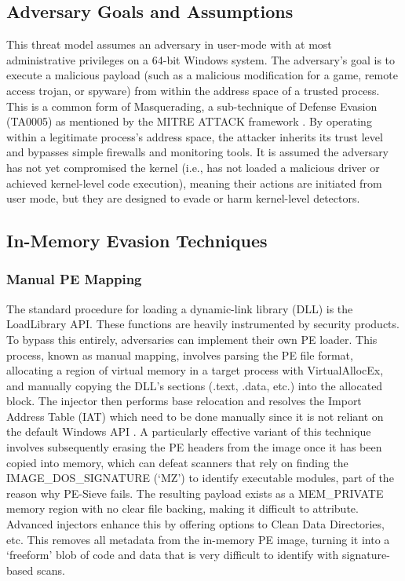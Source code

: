 \documentclass[journal]{IEEEtran}
\begin{document}
\subsection{Adversary Goals and Assumptions}
This threat model assumes an adversary in user-mode with at most administrative privileges on a 64-bit Windows system. The adversary's goal is to execute a malicious payload (such as a malicious modification for a game, remote access trojan, or spyware) from within the address space of a trusted process. This is a common form of Masquerading, a sub-technique of Defense Evasion (TA0005) as mentioned by the MITRE ATTACK framework \cite{MITRE_ATTACK_DEFENSE_EVASION}. By operating within a legitimate process's address space, the attacker inherits its trust level and bypasses simple firewalls and monitoring tools. It is assumed the adversary has not yet compromised the kernel (i.e., has not loaded a malicious driver or achieved kernel-level code execution), meaning their actions are initiated from user mode, but they are designed to evade or harm kernel-level detectors.
\subsection{In-Memory Evasion Techniques}
\subsubsection{Manual PE Mapping}
The standard procedure for loading a dynamic-link library (DLL) is the LoadLibrary API. These functions are heavily instrumented by security products. To bypass this entirely, adversaries can implement their own PE loader. This process, known as manual mapping, involves parsing the PE file format, allocating a region of virtual memory in a target process with VirtualAllocEx, and manually copying the DLL's sections (.text, .data, etc.) into the allocated block. The injector then performs base relocation and resolves the Import Address Table (IAT) which need to be done manually since it is not reliant on the default Windows API \cite{IredTeamModuleStomping}. A particularly effective variant of this technique involves subsequently erasing the PE headers from the image once it has been copied into memory, which can defeat scanners that rely on finding the IMAGE\_DOS\_SIGNATURE (`MZ') to identify executable modules, part of the reason why PE-Sieve fails. The resulting payload exists as a MEM\_PRIVATE memory region with no clear file backing, making it difficult to attribute. Advanced injectors enhance this by offering options to Clean Data Directories, etc. This removes all metadata from the in-memory PE image, turning it into a `freeform' blob of code and data that is very difficult to identify with signature-based scans.
\end{document}
